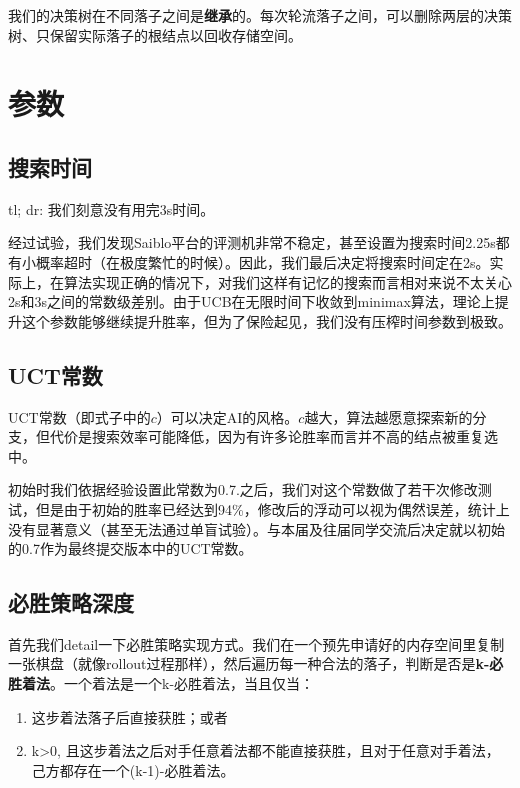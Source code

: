 \documentclass{article}
\begin{document}
	我们的决策树在不同落子之间是\textbf{继承}的。每次轮流落子之间，可以删除两层的决策树、只保留实际落子的根结点以回收存储空间。
	
	\section{参数}
	
	\subsection{搜索时间}
	
	tl; dr: 我们刻意没有用完3s时间。
	
	经过试验，我们发现Saiblo平台的评测机非常不稳定，甚至设置为搜索时间2.25s都有小概率超时（在极度繁忙的时候）。因此，我们最后决定将搜索时间定在2s。实际上，在算法实现正确的情况下，对我们这样有记忆的搜索而言相对来说不太关心2s和3s之间的常数级差别。由于UCB在无限时间下收敛到minimax算法，理论上提升这个参数能够继续提升胜率，但为了保险起见，我们没有压榨时间参数到极致。
	
	\subsection{UCT常数}
	
	UCT常数（即式子中的$c$）可以决定AI的风格。$c$越大，算法越愿意探索新的分支，但代价是搜索效率可能降低，因为有许多论胜率而言并不高的结点被重复选中。
	
	初始时我们依据经验设置此常数为0.7.之后，我们对这个常数做了若干次修改测试，但是由于初始的胜率已经达到94\%，修改后的浮动可以视为偶然误差，统计上没有显著意义（甚至无法通过单盲试验）。与本届及往届同学交流后决定就以初始的0.7作为最终提交版本中的UCT常数。
	
	\subsection{必胜策略深度}
	
	首先我们detail一下必胜策略实现方式。我们在一个预先申请好的内存空间里复制一张棋盘（就像rollout过程那样），然后遍历每一种合法的落子，判断是否是\textbf{k-必胜着法}。一个着法是一个k-必胜着法，当且仅当：
	
	\begin{enumerate}
		\item 这步着法落子后直接获胜；或者
		\item k>0, 且这步着法之后对手任意着法都不能直接获胜，且对于任意对手着法，己方都存在一个(k-1)-必胜着法。
	\end{enumerate}
	
\end{document}
